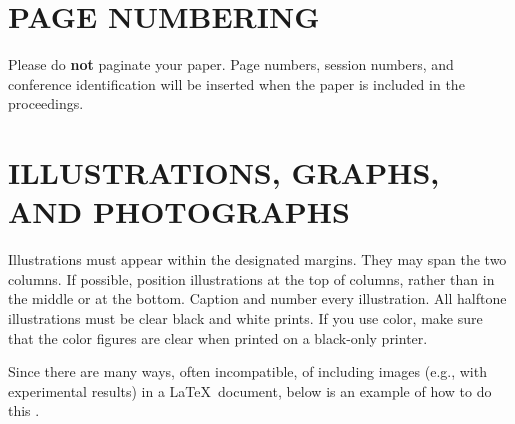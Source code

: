 \documentclass{article}
\begin{document}
\section{PAGE NUMBERING}
\label{sec:page}

Please do {\bf not} paginate your paper.  Page numbers, session numbers, and
conference identification will be inserted when the paper is included in the
proceedings.

\section{ILLUSTRATIONS, GRAPHS, AND PHOTOGRAPHS}
\label{sec:illust}

Illustrations must appear within the designated margins.  They may span the two
columns.  If possible, position illustrations at the top of columns, rather
than in the middle or at the bottom.  Caption and number every illustration.
All halftone illustrations must be clear black and white prints.  If you use
color, make sure that the color figures are clear when printed on a black-only
printer.

Since there are many ways, often incompatible, of including images (e.g., with
experimental results) in a \LaTeX\ document, below is an example of how to do
this \cite{Lamp86}.
\end{document}
